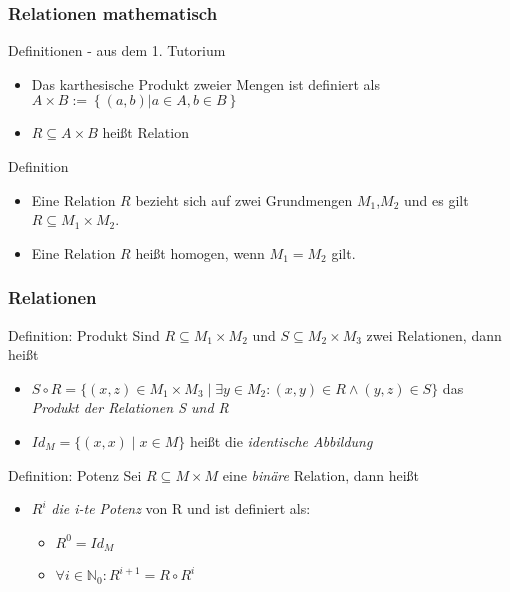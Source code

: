 \begin{frame}
	\frametitle{Relationen mathematisch}
	\begin{block}{Definitionen - aus dem 1. Tutorium}
		\begin{itemize}
			\item Das karthesische Produkt zweier Mengen ist definiert als $A \times B := \left\{(a, b)|a \in A, b \in B\right\}$
			\item $R \subseteq A \times B$ heißt Relation
	  	\end{itemize}
	\end{block}
	\pause
	\begin{block}{Definition}
	\begin{itemize}
		\item Eine Relation $R$ bezieht sich auf zwei Grundmengen $M_1$,$M_2$ und es gilt $R \subseteq M_1\times M_2$. \pause
		\item Eine Relation $R$ heißt homogen, wenn $M_1=M_2$ gilt.
	\end{itemize}
	\end{block}
\end{frame}

%

\begin{frame}
	\frametitle{Relationen}
	\begin{block}{Definition: Produkt}
		Sind $R \subseteq M_1 \times M_2$ und $S \subseteq M_2 \times M_3$ zwei Relationen, dann heißt \pause
		\begin{itemize}
			\item $S \circ R = \{(x,z) \in M_1 \times M_3 \mid \exists y \in M_2 : (x,y) \in R \wedge (y,z) \in S \} $ das {\em Produkt der Relationen S und R} \pause
			\item $Id_M = \{(x,x) \mid x \in M \}$ heißt die {\em identische Abbildung}
		\end{itemize}
	\end{block}
	\pause
	\begin{block}{Definition: Potenz}
		Sei $R \subseteq M \times M$ eine {\em binäre} Relation, dann heißt
		\begin{itemize}
			\item $R^i$ {\em die i-te Potenz} von R und ist definiert als: \pause
			\begin{itemize}
				\item $R^0=Id_M$ \pause
				\item $\forall i \in \mathbb N_0: R^{i+1}=R \circ R^i$
			\end{itemize}
		\end{itemize}
	\end{block}
\end{frame}

